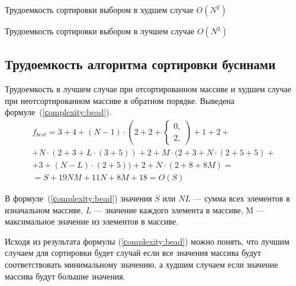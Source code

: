 Трудоемкость сортировки выбором в худшем случае $O(N^2)$

Трудоемкость сортировки выбором в лучшем случае $O(N^2)$



\subsection{Трудоемкость алгоритма сортировки бусинами}

Трудоемкость в лучшем случае при отсортированном массиве и худшем случае при неотсортированном массиве в обратном порядке. 
Выведена формуле~(\ref{сomplexity:bead}).
\begin{equation}
	\label{сomplexity:bead}
	\begin{gathered}
		f_{best} = 3 + 4 + (N - 1) \cdot (2 + 2 + 
		\begin{cases}
			0, \\
			2,
		\end{cases}) 
		+ 1 + 2 + \\
		+ N \cdot (2 + 3 + L \cdot (3 + 5)) + 2 + M \cdot (2 + 3 + N \cdot (2 + 5 + 5) + \\
		+3 + (N - L) \cdot (2 + 5)) + 2 + N \cdot (2 + 8 + 8M) = \\
		= S + 19NM + 11N + 8M + 18 = O(S)
	\end{gathered}
\end{equation}

В формуле~(\ref{сomplexity:bead}) значения $S$ или $NL$ --- сумма всех элементов в изначальном массиве, $L$ --- значение каждого элемента в массиве,  M --- максимальное значение из элементов в массиве.

Исходя из результата формулы (\ref{сomplexity:bead}) можно понять, что лучшим случаем для сортировки будет случай если все значения массива будут соответствовать минимальному значению, а худшим случаем если значение массива будут большие значения. 

